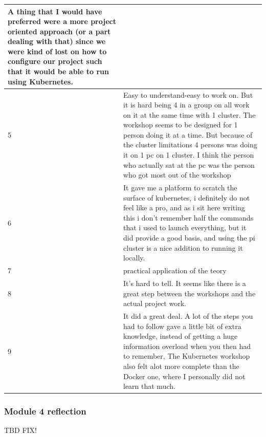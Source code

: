 \begin{longtable}{|p{0.3cm}|p{14.7cm}|}
	\noindent A thing that I would have preferred were a more project oriented approach (or a part dealing with that) since we were kind of lost on how to configure our project such that it would be able to run using Kubernetes.
 \\ \hline 
5 & Easy to understand-easy to work on. But it is hard being 4 in a group on all work on it at the same time with 1 cluster. The workshop seems to be designed for 1 person doing it at a time. But because of the cluster limitations 4 persons was doing it on 1 pc on 1 cluster. I think the person who actually sat at the pc was the person who got most out of the workshop \\ \hline 
6 & It gave me a platform to scratch the surface of kubernetes, i definitely do not feel like a pro, and as i sit here writing this i don't remember half the commands that i used to launch everything, but it did provide a good basis, and using the pi cluster is a nice addition to running it locally. \\ \hline 
7 & practical application of the teory \\ \hline 
8 & It's hard to tell. It seems like there is a great step between the workshops and the actual project work. \\ \hline 
9 & It did a great deal. A lot of the steps you had to follow gave a little bit of extra knowledge, instead of getting a huge information overload when you then had to remember, The Kubernetes workshop also felt alot more complete than the Docker one, where I personally did not learn that much. \\ \hline 
\end{longtable}
\normalsize





\subsubsection*{Module 4 reflection}
TBD FIX!


